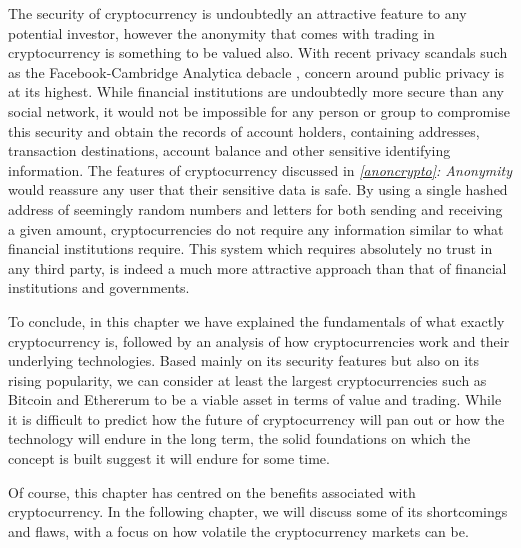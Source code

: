 The security of cryptocurrency is undoubtedly an attractive feature to any potential investor, however the anonymity that comes with trading in cryptocurrency is something to be valued also. With recent privacy scandals such as the Facebook-Cambridge Analytica debacle \cite{camanalytica}, concern around public privacy is at its highest. While financial institutions are undoubtedly more secure than any social network, it would not be impossible for any person or group to compromise this security and obtain the records of account holders, containing addresses, transaction destinations, account balance and other sensitive identifying information. The features of cryptocurrency discussed in \textit{\ref{anoncrypto}: Anonymity} would reassure any user that their sensitive data is safe. By using a single hashed address of seemingly random numbers and letters for both sending and receiving a given amount, cryptocurrencies do not require any information similar to what financial institutions require. This system which requires absolutely no trust in any third party, is indeed a much more attractive approach than that of financial institutions and governments.

To conclude, in this chapter we have explained the fundamentals of what exactly cryptocurrency is, followed by an analysis of how cryptocurrencies work and their underlying technologies. Based mainly on its security features but also on its rising popularity, we can consider at least the largest cryptocurrencies such as Bitcoin and Ethererum to be a viable asset in terms of value and trading. While it is difficult to predict how the future of cryptocurrency will pan out or how the technology will endure in the long term, the solid foundations on which the concept is built suggest it will endure for some time.

Of course, this chapter has centred on the benefits associated with cryptocurrency. In the following chapter, we will discuss some of its shortcomings and flaws, with a focus on how volatile the cryptocurrency markets can be.
